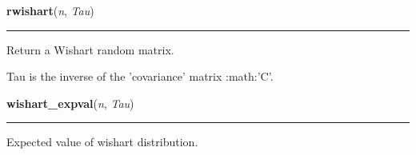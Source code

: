     \vspace{0.5ex}

    \begin{boxedminipage}{\textwidth}

    \raggedright \textbf{rwishart}(\textit{n}, \textit{Tau})

    \vspace{-1.5ex}

    \rule{\textwidth}{0.5\fboxrule}

Return a Wishart random matrix.

Tau is the inverse of the 'covariance' matrix :math:'C'.
    \vspace{1ex}

    \end{boxedminipage}

    \label{pymc:distributions:wishart_expval}

    \vspace{0.5ex}

    \begin{boxedminipage}{\textwidth}

    \raggedright \textbf{wishart\_expval}(\textit{n}, \textit{Tau})

    \vspace{-1.5ex}

    \rule{\textwidth}{0.5\fboxrule}

Expected value of wishart distribution.
    \vspace{1ex}

    \end{boxedminipage}

    \label{pymc:distributions:wishart_like}

    \vspace{0.5ex}


